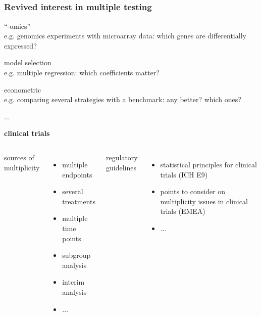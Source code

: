 \documentclass[xcolor={pdftex,dvipsnames,table}]{beamer}
\begin{document}
\subsection{}
\begin{frame}
\frametitle{Revived interest in multiple testing}


\textcolor{cambridgedarkblue}{\large{``-omics''}}   \\
\scriptsize{e.g. genomics experiments with microarray data: which genes are differentially expressed?}
\smallskip
\smallskip

\textcolor{cambridgedarkblue}{\large{model selection}}\\
\scriptsize{e.g. multiple regression: which coefficients matter?}
\smallskip
\smallskip

\textcolor{cambridgedarkblue}{\large{econometric}}\\
\scriptsize{e.g. comparing several strategies with a benchmark: any better? which ones?}
\smallskip
\smallskip

\textcolor{cambridgedarkblue}{\large{...}}
\smallskip
\smallskip


\begin{block}{\Large \textbf{clinical trials}}
\begin{columns}[t]
\normalsize{
\textcolor{cambridgedarkorange}{sources of multiplicity}
\begin{itemize}
\item multiple endpoints
\item several treatments
\item multiple time points
\item subgroup analysis
\item interim analysis
\item $\ldots$
\end{itemize}}

\normalsize{
\textcolor{cambridgedarkorange}{regulatory guidelines}
\begin{itemize}
\item statistical principles for clinical trials (ICH E9)
\item points
to consider on multiplicity issues in clinical
trials (EMEA)
\item $\ldots$
\end{itemize}}
\end{columns}
\end{block}



\end{frame}
\end{document}
